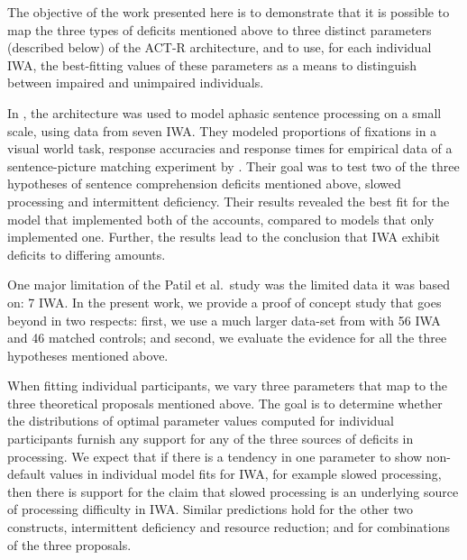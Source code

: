 \documentclass{cambridge7A}\usepackage[]{graphicx}\usepackage[]{color}
\begin{document}
The objective of the work presented here is to demonstrate that it is possible to map the three types of deficits mentioned above to three distinct parameters (described below) of the ACT-R architecture, and to use, for each individual IWA, the best-fitting values of these parameters as a means to distinguish between impaired and unimpaired individuals.

In \cite{PatilEtAl2016}, the \cite{LewisVasishth2005} architecture was used to model aphasic sentence processing on a small scale, using data from seven IWA. 
They modeled proportions of fixations in a visual world task, response accuracies and response times for empirical data of a sentence-picture matching experiment by \cite{hanneetal11}. Their goal was to test two of the three hypotheses of sentence comprehension deficits mentioned above, slowed processing and intermittent deficiency.  
Their results revealed the best fit for the model that implemented both of the accounts, compared to models that only implemented one. Further, the results lead to the conclusion that IWA exhibit deficits to differing amounts.

One major limitation of the Patil et al.\ study was the limited data it was based on: 7 IWA.
In the present work, we provide a proof of concept study that goes beyond \cite{PatilEtAl2016} in two respects: first, we use a much larger data-set from \cite{CaplanEtAl2015} with 56 IWA and 46 matched controls; and second, we evaluate the evidence for all the three hypotheses mentioned above. %


When fitting individual participants, we vary three parameters that map to the three theoretical proposals mentioned above. The goal is to determine whether the distributions of optimal parameter values computed for individual participants furnish any support for any of the three sources of deficits in processing. 
We expect that if there is a tendency in one parameter to show non-default values in individual model fits for IWA, for example slowed processing,
then there is support for the claim that slowed processing is an underlying source of processing difficulty in IWA. Similar predictions hold for the other two constructs, intermittent deficiency and resource reduction; and for combinations of the three proposals.
\end{document}
